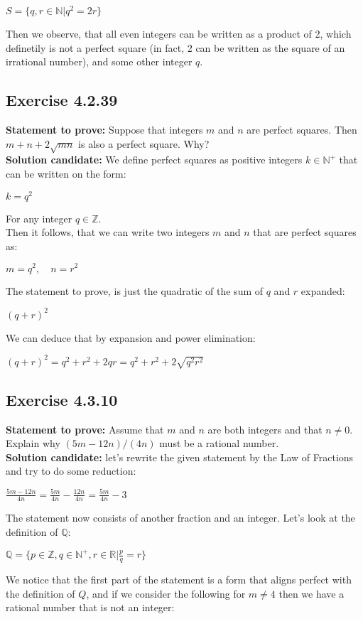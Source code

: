 \documentclass{report}
\newcommand{\cent}[1]{\begin{center}#1\end{center}}
\newcommand{\doubleR}{\mathbb{R}}
\newcommand{\doubleZ}{\mathbb{Z}}
\newcommand{\doubleN}{\mathbb{N}}
\newcommand{\doubleQ}{\mathbb{Q}}
\newcommand{\Prove}{\textbf{Statement to prove: }}
\newcommand{\solution}{\textbf{Solution candidate: }}
\newcommand{\QED}{\boxed{}}
\newcommand{\Exercise}[1]{\subsection{Exercise #1}}
\begin{document}
	\cent{$S = \{q,r \in \doubleN | q^2 = 2r\}$}
	
	Then we observe, that all even integers can be written as  a product of 2, which definetily is not a perfect square (in fact, 2 can be written as the square of an irrational number), and some other integer $q$.\\
	\QED
	
	\Exercise{4.2.39}
	
	\Prove
	Suppose that integers $m$ and $n$ are perfect squares. Then $m+n+2\sqrt{mn}$ is also a perfect square. Why?\\
	
	\solution
	We define perfect squares as positive integers $k \in \doubleN^+$ that can be written on the form:
	
 	\cent{$k = q^2$}
 	
 	For any integer $q \in \doubleZ$.\\
 	
 	Then it follows, that we can write two integers $m$ and $n$ that are perfect squares as:
 	
 	\cent{$m = q^2, \quad n = r^2$}
	
	The statement to prove, is just the quadratic of the sum of $q$ and $r$ expanded:
	 \cent{$(q+r)^2$} 
	 
	 We can deduce that by expansion and power elimination:
	 
	\cent{$(q+r)^2 = q^2+r^2 + 2qr =q^2+r^2 + 2\sqrt{q^2 r^2} $}
	
	\QED	 
	
	\Exercise{4.3.10}
	
	\Prove
	Assume that $m$ and $n$ are both integers and that  $n\neq 0$. Explain why $(5m -12n)/(4n)$ must be a rational number.\\
	
	\solution
	let's rewrite the given statement by the Law of Fractions and try to do some reduction:
	
	\cent{$\frac{5m-12n}{4n} = \frac{5m}{4n} - \frac{12n}{4n} = \frac{5m}{4n} - 3 $}
	
	The statement now consists of another fraction and an integer. Let's look at the definition of $\doubleQ$:
	
	\cent{$\doubleQ = \{p \in \doubleZ, q \in \doubleN^+, r \in \doubleR | \frac{p}{q} = r\}$}
	
	We notice that the first part of the statement is a form that aligns perfect with the definition of $Q$, and if we consider the following for $m \neq 4$ then we have a rational number that is not an integer:
	
\end{document}

